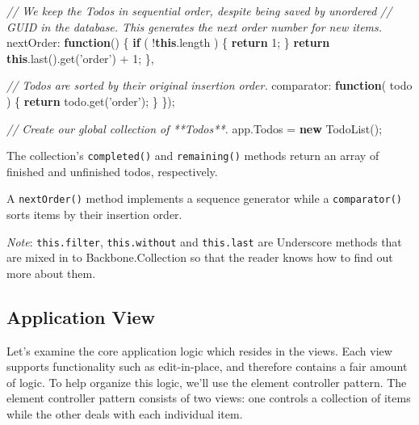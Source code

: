 \documentclass[9pt]{book}
\newenvironment{Shaded}{}{}
\newcommand{\KeywordTok}[1]{\textcolor[rgb]{0.00,0.44,0.13}{\textbf{{#1}}}}
\newcommand{\DataTypeTok}[1]{\textcolor[rgb]{0.56,0.13,0.00}{{#1}}}
\newcommand{\DecValTok}[1]{\textcolor[rgb]{0.25,0.63,0.44}{{#1}}}
\newcommand{\StringTok}[1]{\textcolor[rgb]{0.25,0.44,0.63}{{#1}}}
\newcommand{\CommentTok}[1]{\textcolor[rgb]{0.38,0.63,0.69}{\textit{{#1}}}}
\newcommand{\OtherTok}[1]{\textcolor[rgb]{0.00,0.44,0.13}{{#1}}}
\newcommand{\FunctionTok}[1]{\textcolor[rgb]{0.02,0.16,0.49}{{#1}}}
\newcommand{\NormalTok}[1]{{#1}}
\begin{document}
\begin{Shaded}
\begin{Highlighting}[]
    \CommentTok{// We keep the Todos in sequential order, despite being saved by unordered}
    \CommentTok{// GUID in the database. This generates the next order number for new items.}
    \DataTypeTok{nextOrder}\NormalTok{: }\KeywordTok{function}\NormalTok{() \{}
      \KeywordTok{if} \NormalTok{( !}\KeywordTok{this}\NormalTok{.}\FunctionTok{length} \NormalTok{) \{}
        \KeywordTok{return} \DecValTok{1}\NormalTok{;}
      \NormalTok{\}}
      \KeywordTok{return} \KeywordTok{this}\NormalTok{.}\FunctionTok{last}\NormalTok{().}\FunctionTok{get}\NormalTok{(}\StringTok{'order'}\NormalTok{) + }\DecValTok{1}\NormalTok{;}
    \NormalTok{\},}

    \CommentTok{// Todos are sorted by their original insertion order.}
    \DataTypeTok{comparator}\NormalTok{: }\KeywordTok{function}\NormalTok{( todo ) \{}
      \KeywordTok{return} \OtherTok{todo}\NormalTok{.}\FunctionTok{get}\NormalTok{(}\StringTok{'order'}\NormalTok{);}
    \NormalTok{\}}
  \NormalTok{\});}

  \CommentTok{// Create our global collection of **Todos**.}
  \OtherTok{app}\NormalTok{.}\FunctionTok{Todos} \NormalTok{= }\KeywordTok{new} \FunctionTok{TodoList}\NormalTok{();}
\end{Highlighting}
\end{Shaded}

The collection's \texttt{completed()} and \texttt{remaining()} methods
return an array of finished and unfinished todos, respectively.

A \texttt{nextOrder()} method implements a sequence generator while a
\texttt{comparator()} sorts items by their insertion order.

\emph{Note}: \texttt{this.filter}, \texttt{this.without} and
\texttt{this.last} are Underscore methods that are mixed in to
Backbone.Collection so that the reader knows how to find out more about
them.

\subsection{Application View}\label{application-view}

Let's examine the core application logic which resides in the views.
Each view supports functionality such as edit-in-place, and therefore
contains a fair amount of logic. To help organize this logic, we'll use
the element controller pattern. The element controller pattern consists
of two views: one controls a collection of items while the other deals
with each individual item.
\end{document}
